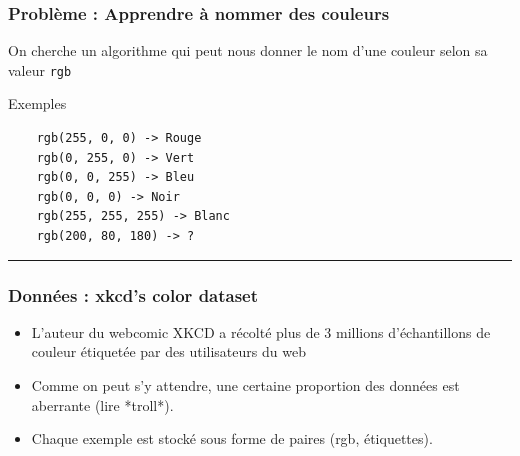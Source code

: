\documentclass[french]{beamer}
\begin{document}
\begin{frame}[fragile]
\frametitle{Problème : Apprendre à nommer des
couleurs}

On cherche un algorithme qui peut nous donner le nom d'une couleur selon
sa valeur \texttt{rgb}

{Exemples}

\begin{verbatim}
    rgb(255, 0, 0) -> Rouge
    rgb(0, 255, 0) -> Vert
    rgb(0, 0, 255) -> Bleu
    rgb(0, 0, 0) -> Noir
    rgb(255, 255, 255) -> Blanc
    rgb(200, 80, 180) -> ?
\end{verbatim}

\begin{center}\rule{3in}{0.4pt}\end{center}
\end{frame}

\begin{frame}
\frametitle{Données : xkcd's color dataset}

\begin{itemize}
\item L'auteur du webcomic XKCD a récolté plus de 3 millions d'échantillons de couleur étiquetée par des utilisateurs du web

\item Comme on peut s'y attendre, une certaine proportion des données est aberrante (lire *troll*).

\item Chaque exemple est stocké sous forme de paires (rgb, étiquettes).
\end{itemize}

\end{frame}
\end{document}
